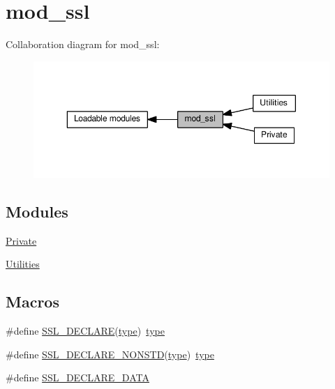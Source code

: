 \hypertarget{group__MOD__SSL}{}\section{mod\+\_\+ssl}
\label{group__MOD__SSL}
Collaboration diagram for mod\+\_\+ssl\+:
\nopagebreak
\begin{figure}[H]
\begin{center}
\leavevmode
\includegraphics[width=350pt]{group__MOD__SSL}
\end{center}
\end{figure}
\subsection*{Modules}
\begin{DoxyCompactItemize}
\item 
\hyperlink{group__MOD__SSL__PRIVATE}{Private}
\item 
\hyperlink{group__MOD__SSL__UTIL}{Utilities}
\end{DoxyCompactItemize}
\subsection*{Macros}
\begin{DoxyCompactItemize}
\item 
\#define \hyperlink{group__MOD__SSL_ga49d0b6bbc709b388df685d2441dd4a94}{S\+S\+L\+\_\+\+D\+E\+C\+L\+A\+RE}(\hyperlink{pcre_8txt_a2463fbbe8b0c90b90db12195e1edaa5d}{type})~\hyperlink{pcre_8txt_a2463fbbe8b0c90b90db12195e1edaa5d}{type}
\item 
\#define \hyperlink{group__MOD__SSL_ga9a18d6e20a71e7ca923f0cf8997808d4}{S\+S\+L\+\_\+\+D\+E\+C\+L\+A\+R\+E\+\_\+\+N\+O\+N\+S\+TD}(\hyperlink{pcre_8txt_a2463fbbe8b0c90b90db12195e1edaa5d}{type})~\hyperlink{pcre_8txt_a2463fbbe8b0c90b90db12195e1edaa5d}{type}
\item 
\#define \hyperlink{group__MOD__SSL_ga0a1339082c9068b4ba593fdb0ae6092d}{S\+S\+L\+\_\+\+D\+E\+C\+L\+A\+R\+E\+\_\+\+D\+A\+TA}
\end{DoxyCompactItemize}
